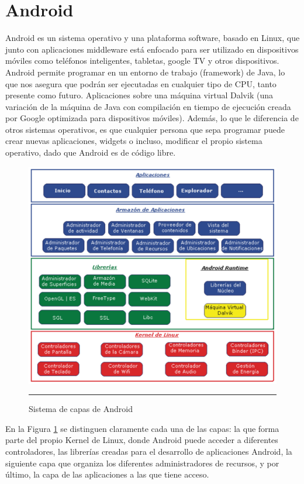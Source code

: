 \section{Android}

Android es un sistema operativo y una plataforma software, basado en Linux, que junto con aplicaciones middleware está enfocado para ser utilizado en dispositivos móviles como teléfonos inteligentes, tabletas, google TV y otros dispositivos. Android permite programar en un entorno de trabajo (framework) de Java, lo que nos asegura que podrán ser ejecutadas en cualquier tipo de CPU, tanto presente como futuro. Aplicaciones sobre una máquina virtual Dalvik (una variación de la máquina de Java con compilación en tiempo de ejecución creada por Google optimizada para dispositivos móviles). Además, lo que le diferencia de otros sistemas operativos, es que cualquier persona que sepa programar puede crear nuevas aplicaciones, widgets o incluso, modificar el propio sistema operativo, dado que Android es de código libre. \cite{Android}

\begin{figure}[htbp]
	\centering
		\includegraphics[width=1\textwidth]{Figuras/capasAndroid.png}
		\rule{30em}{0.5pt}
	\caption[Sistema de capas de Android]{Sistema de capas de Android}
	\label{fig:capasAndroid}
\end{figure}

En la Figura \ref{fig:capasAndroid} se distinguen claramente cada una de las capas: la que forma parte del propio Kernel de Linux, donde Android puede acceder a diferentes controladores, las librerías creadas para el desarrollo de aplicaciones Android, la siguiente capa que organiza los diferentes administradores de recursos, y por último, la capa de las aplicaciones a las que tiene acceso.

